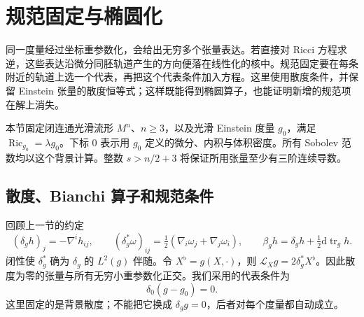 
% 
% 

\section{规范固定与椭圆化}
\label{g3:sec:2502}

同一度量经过坐标重参数化，会给出无穷多个张量表达。若直接对 Ricci 方程求逆，这些表达沿微分同胚轨道产生的方向便落在线性化的核中。规范固定要在每条附近的轨道上选一个代表，再把这个代表条件加入方程。这里使用散度条件，并保留 Einstein 张量的散度恒等式；这样既能得到椭圆算子，也能证明新增的规范项在解上消失。

本节固定闭连通光滑流形 \(M^n\)、\(n\ge3\)，以及光滑 Einstein 度量 \(g_0\)，满足 \(\operatorname{Ric}_{g_0}=\lambda g_0\)。下标 \(0\) 表示用 \(g_0\) 定义的微分、内积与体积密度。所有 Sobolev 范数均以这个背景计算。整数 \(s>n/2+3\) 将保证所用张量至少有三阶连续导数。

\subsection{散度、Bianchi 算子和规范条件}
\label{g3:subsec:2502:01}
回顾上一节的约定
\[
	(\delta_g h)_j=-\nabla^i h_{ij},\qquad
	(\delta_g^*\omega)_{ij}=\tfrac12(\nabla_i\omega_j+\nabla_j\omega_i),\qquad
	\beta_g h=\delta_g h+\tfrac12\mathrm d\operatorname{tr}_g h.
\]
闭性使 \(\delta_g^*\) 确为 \(\delta_g\) 的 \(L^2(g)\) 伴随。令 \(X^\flat=g(X,\cdot)\)，则 \(\mathcal L_Xg=2\delta_g^*X^\flat\)。因此散度为零的张量与所有无穷小重参数化正交。我们采用的代表条件为
\begin{equation}\label{g3:eq:metric-divergence-gauge}
	\delta_0(g-g_0)=0.
\end{equation}
这里固定的是背景散度；不能把它换成 \(\delta_g g=0\)，后者对每个度量都自动成立。

